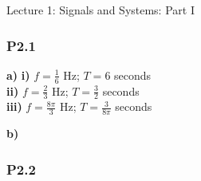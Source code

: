 \documentclass[12pt]{article}
\begin{document}
\begin{center}
    Lecture 1: Signals and Systems: Part I
\end{center}

\subsubsection*{P2.1}
\textbf{a)}
\textbf{i)}
$f = \frac{1}{6}$ Hz; $T = 6$ seconds
~\\

\noindent
\textbf{ii)}
$f = \frac{2}{3}$ Hz; $T = \frac{3}{2}$ seconds
~\\

\noindent
\textbf{iii)}
$f = \frac{8\pi}{3}$ Hz; $T = \frac{3}{8\pi}$ seconds

\textbf{b)}

\subsubsection*{P2.2}
\end{document}
